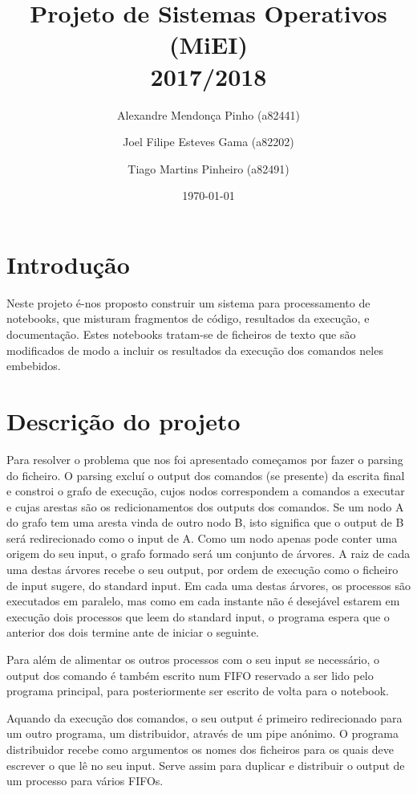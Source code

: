 \documentclass[12pt]{report}
\title{Projeto de Sistemas Operativos (MiEI) \\ 2017/2018}
\author{Alexandre Mendonça Pinho (a82441) \and Joel Filipe Esteves Gama (a82202) \and Tiago Martins Pinheiro (a82491)}
\date{\today}
\newcommand\tab[1][0.5cm]{\hspace*{#1}}
\begin{document}
\maketitle

\tableofcontents

\chapter{Introdução}
\label{sec:introducao}

\tab Neste projeto é-nos proposto construir um sistema para processamento de notebooks, que misturam fragmentos de código, resultados da execução, e documentação. Estes notebooks tratam-se de ficheiros de texto que são modificados de modo a incluir os resultados da execução dos comandos neles embebidos.

\chapter{Descrição do projeto}
\label{sec:descricao}

 Para resolver o problema que nos foi apresentado começamos por fazer o parsing do ficheiro. O parsing excluí o output dos comandos (se presente) da escrita final e constroi o grafo de execução, cujos nodos correspondem a comandos a executar e cujas arestas são os redicionamentos dos outputs dos comandos. Se um nodo A do grafo tem uma aresta vinda de outro nodo B, isto significa que o output de B será redirecionado como o input de A. Como um nodo apenas pode conter uma origem do seu input, o grafo formado será um conjunto de árvores. A raiz de cada uma destas árvores recebe o seu output, por ordem de execução como o ficheiro de input sugere, do standard input. Em cada uma destas árvores, os processos são executados em paralelo, mas como em cada instante não é desejável estarem em execução dois processos que leem do standard input, o programa espera que o anterior dos dois termine ante de iniciar o seguinte.

 Para além de alimentar os outros processos com o seu input se necessário, o output dos comando é também escrito num FIFO reservado a ser lido pelo programa principal, para posteriormente ser escrito de volta para o notebook.

 Aquando da execução dos comandos, o seu output é primeiro redirecionado para um outro programa, um distribuidor, através de um pipe anónimo. O programa distribuidor recebe como argumentos os nomes dos ficheiros para os quais deve escrever o que lê no seu input. Serve assim para duplicar e distribuir o output de um processo para vários FIFOs.
\end{document}
